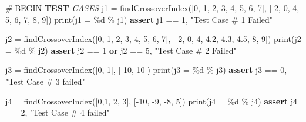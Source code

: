 \documentclass[
]{article}
\newenvironment{Shaded}{}{}
\newcommand{\AlertTok}[1]{\textcolor[rgb]{1.00,0.00,0.00}{\textbf{#1}}}
\newcommand{\BuiltInTok}[1]{\textcolor[rgb]{0.00,0.50,0.00}{#1}}
\newcommand{\CommentTok}[1]{\textcolor[rgb]{0.38,0.63,0.69}{\textit{#1}}}
\newcommand{\ControlFlowTok}[1]{\textcolor[rgb]{0.00,0.44,0.13}{\textbf{#1}}}
\newcommand{\DecValTok}[1]{\textcolor[rgb]{0.25,0.63,0.44}{#1}}
\newcommand{\FloatTok}[1]{\textcolor[rgb]{0.25,0.63,0.44}{#1}}
\newcommand{\KeywordTok}[1]{\textcolor[rgb]{0.00,0.44,0.13}{\textbf{#1}}}
\newcommand{\NormalTok}[1]{#1}
\newcommand{\OperatorTok}[1]{\textcolor[rgb]{0.40,0.40,0.40}{#1}}
\newcommand{\RegionMarkerTok}[1]{#1}
\newcommand{\SpecialCharTok}[1]{\textcolor[rgb]{0.25,0.44,0.63}{#1}}
\newcommand{\StringTok}[1]{\textcolor[rgb]{0.25,0.44,0.63}{#1}}
\begin{document}
\begin{Shaded}
\begin{Highlighting}[]
\CommentTok{\# }\RegionMarkerTok{BEGIN}\CommentTok{ }\AlertTok{TEST}\CommentTok{ CASES}
\NormalTok{j1 }\OperatorTok{=}\NormalTok{ findCrossoverIndex([}\DecValTok{0}\NormalTok{, }\DecValTok{1}\NormalTok{, }\DecValTok{2}\NormalTok{, }\DecValTok{3}\NormalTok{, }\DecValTok{4}\NormalTok{, }\DecValTok{5}\NormalTok{, }\DecValTok{6}\NormalTok{, }\DecValTok{7}\NormalTok{], [}\OperatorTok{{-}}\DecValTok{2}\NormalTok{, }\DecValTok{0}\NormalTok{, }\DecValTok{4}\NormalTok{, }\DecValTok{5}\NormalTok{, }\DecValTok{6}\NormalTok{, }\DecValTok{7}\NormalTok{, }\DecValTok{8}\NormalTok{, }\DecValTok{9}\NormalTok{])}
\BuiltInTok{print}\NormalTok{(}\StringTok{\textquotesingle{}j1 = }\SpecialCharTok{\%d}\StringTok{\textquotesingle{}} \OperatorTok{\%}\NormalTok{ j1)}
\ControlFlowTok{assert}\NormalTok{ j1 }\OperatorTok{==} \DecValTok{1}\NormalTok{, }\StringTok{"Test Case \# 1 Failed"}

\NormalTok{j2 }\OperatorTok{=}\NormalTok{ findCrossoverIndex([}\DecValTok{0}\NormalTok{, }\DecValTok{1}\NormalTok{, }\DecValTok{2}\NormalTok{, }\DecValTok{3}\NormalTok{, }\DecValTok{4}\NormalTok{, }\DecValTok{5}\NormalTok{, }\DecValTok{6}\NormalTok{, }\DecValTok{7}\NormalTok{], [}\OperatorTok{{-}}\DecValTok{2}\NormalTok{, }\DecValTok{0}\NormalTok{, }\DecValTok{4}\NormalTok{, }\FloatTok{4.2}\NormalTok{, }\FloatTok{4.3}\NormalTok{, }\FloatTok{4.5}\NormalTok{, }\DecValTok{8}\NormalTok{, }\DecValTok{9}\NormalTok{])}
\BuiltInTok{print}\NormalTok{(}\StringTok{\textquotesingle{}j2 = }\SpecialCharTok{\%d}\StringTok{\textquotesingle{}} \OperatorTok{\%}\NormalTok{ j2)}
\ControlFlowTok{assert}\NormalTok{ j2 }\OperatorTok{==} \DecValTok{1} \KeywordTok{or}\NormalTok{ j2 }\OperatorTok{==} \DecValTok{5}\NormalTok{, }\StringTok{"Test Case \# 2 Failed"}

\NormalTok{j3 }\OperatorTok{=}\NormalTok{ findCrossoverIndex([}\DecValTok{0}\NormalTok{, }\DecValTok{1}\NormalTok{], [}\OperatorTok{{-}}\DecValTok{10}\NormalTok{, }\DecValTok{10}\NormalTok{])}
\BuiltInTok{print}\NormalTok{(}\StringTok{\textquotesingle{}j3 = }\SpecialCharTok{\%d}\StringTok{\textquotesingle{}} \OperatorTok{\%}\NormalTok{ j3)}
\ControlFlowTok{assert}\NormalTok{ j3 }\OperatorTok{==} \DecValTok{0}\NormalTok{, }\StringTok{"Test Case \# 3 failed"}

\NormalTok{j4 }\OperatorTok{=}\NormalTok{ findCrossoverIndex([}\DecValTok{0}\NormalTok{,}\DecValTok{1}\NormalTok{, }\DecValTok{2}\NormalTok{, }\DecValTok{3}\NormalTok{], [}\OperatorTok{{-}}\DecValTok{10}\NormalTok{, }\OperatorTok{{-}}\DecValTok{9}\NormalTok{, }\OperatorTok{{-}}\DecValTok{8}\NormalTok{, }\DecValTok{5}\NormalTok{])}
\BuiltInTok{print}\NormalTok{(}\StringTok{\textquotesingle{}j4 = }\SpecialCharTok{\%d}\StringTok{\textquotesingle{}} \OperatorTok{\%}\NormalTok{ j4)}
\ControlFlowTok{assert}\NormalTok{ j4 }\OperatorTok{==} \DecValTok{2}\NormalTok{, }\StringTok{"Test Case \# 4 failed"}


\end{Highlighting}
\end{Shaded}
\end{document}
